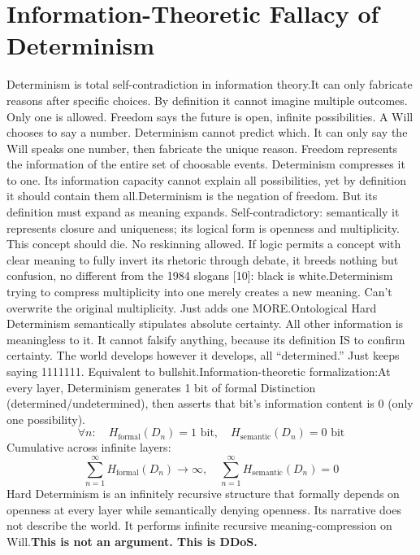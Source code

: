 \documentclass[11pt]{article}
\renewcommand{\\}[1][\mynewlineskip]{\oldnewline[#1]}
\begin{document}
\section{Information-Theoretic Fallacy of Determinism}
Determinism is total self-contradiction in information theory.\\
It can only fabricate reasons after specific choices. By definition it cannot imagine multiple outcomes. Only one is allowed. Freedom says the future is open, infinite possibilities. A Will chooses to say a number. Determinism cannot predict which. It can only say the Will speaks one number, then fabricate the unique reason. Freedom represents the information of the entire set of choosable events. Determinism compresses it to one. Its information capacity cannot explain all possibilities, yet by definition it should contain them all.\\
Determinism is the negation of freedom. But its definition must expand as meaning expands. Self-contradictory: semantically it represents closure and uniqueness; its logical form is openness and multiplicity. This concept should die. No reskinning allowed. If logic permits a concept with clear meaning to fully invert its rhetoric through debate, it breeds nothing but confusion, no different from the 1984 slogans [10]: black is white.\\
Determinism trying to compress multiplicity into one merely creates a new meaning. Can't overwrite the original multiplicity. Just adds one MORE.\\
Ontological Hard Determinism semantically stipulates absolute certainty. All other information is meaningless to it. It cannot falsify anything, because its definition IS to confirm certainty. The world develops however it develops, all ``determined.'' Just keeps saying 1111111. Equivalent to bullshit.\\
Information-theoretic formalization:\\
At every layer, Determinism generates 1 bit of formal Distinction (determined/undetermined), then asserts that bit's information content is 0 (only one possibility).
\[
\forall n: \quad H_{\text{formal}}(D_n) = 1 \text{ bit}, \quad H_{\text{semantic}}(D_n) = 0 \text{ bit}
\]
Cumulative across infinite layers:
\[
\sum_{n=1}^{\infty} H_{\text{formal}}(D_n) \to \infty, \quad \sum_{n=1}^{\infty} H_{\text{semantic}}(D_n) = 0
\]
Hard Determinism is an infinitely recursive structure that formally depends on openness at every layer while semantically denying openness. Its narrative does not describe the world. It performs infinite recursive meaning-compression on Will.\\
\textbf{This is not an argument. This is DDoS.}
\end{document}
